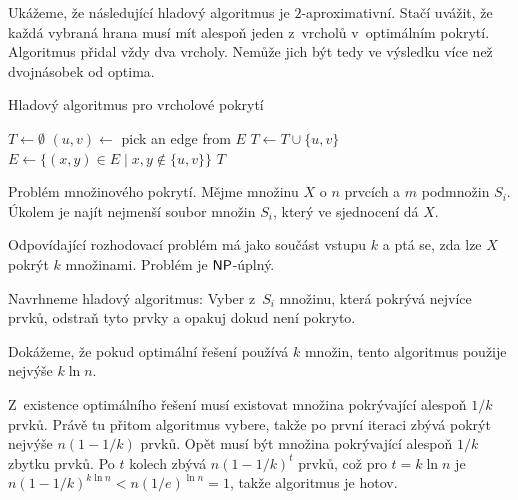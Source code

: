 \pagebreak

\begin{example}
Ukážeme, že následující hladový algoritmus je $2$-aproximativní.  Stačí
uvážit, že každá vybraná hrana musí mít alespoň jeden z~vrcholů
v~optimálním pokrytí. Algoritmus přidal vždy dva vrcholy. Nemůže jich
být tedy ve výsledku více než dvojnásobek od optima.

\begin{algorithm}
\caption{Hladový algoritmus pro vrcholové pokrytí}
\begin{algorithmic}[1]
    \State $T \gets \emptyset$
        \State $(u,v) \gets$ pick an edge from $E$
        \State $T \gets T \cup \{u,v\}$
        \State $E \gets \{ (x,y) \in E \mid x,y \not \in \{u, v\} \}$
    \EndWhile
    \State \Return $T$
\EndFunction
\end{algorithmic}
\end{algorithm}
\end{example}

\begin{example}

    Problém množinového pokrytí. Mějme množinu $X$ o $n$ prvcích
    a $m$ podmnožin $S_i$. Úkolem je najít nejmenší soubor množin $S_i$,
    který ve sjednocení dá $X$.

    Odpovídající rozhodovací problém má jako součást vstupu $k$ a ptá
    se, zda lze $X$ pokrýt $k$ množinami. Problém je ${\mathsf{NP}}$-úplný.

    Navrhneme hladový algoritmus: Vyber z~$S_i$ množinu, která pokrývá
    nejvíce prvků, odstraň tyto prvky a opakuj dokud není pokryto.

    Dokážeme, že pokud optimální řešení používá $k$ množin, tento
    algoritmus použije nejvýše $k \ln n$.

    Z~existence optimálního řešení musí existovat množina pokrývající alespoň
    $1/k$ prvků. Právě tu přitom algoritmus vybere, takže po první
    iteraci zbývá pokrýt nejvýše $n(1 - 1/k)$ prvků.
    Opět musí být množina pokrývající alespoň $1/k$ zbytku prvků.
    Po $t$ kolech zbývá $n(1-1/k)^t$ prvků,
    což pro $t = k \ln n$ je $n(1-1/k)^{k \ln n} < n(1/e)^{\ln n} = 1$,
    takže algoritmus je hotov.
\end{example}

